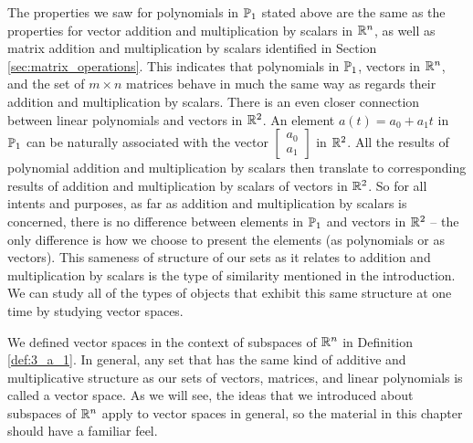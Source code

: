 The properties we saw for polynomials in $\mathbb{P}_1$ stated above are the same as the properties for vector addition and multiplication by scalars in $\mathbb{R}^n$, as well as matrix addition and multiplication by scalars identified in Section \ref{sec:matrix_operations}. This indicates that polynomials in $\mathbb{P}_1$, vectors in $\mathbb{R}^n$, and the set of $m \times n$ matrices behave in much the same way as regards their addition and multiplication by scalars. There is an even closer connection between linear polynomials and vectors in $\mathbb{R}^2$. An element $a(t) = a_0 + a_1t$ in $\mathbb{P}_1$ can be naturally associated with the vector $\left[ \begin{array}{c} a_0 \\ a_1 \end{array} \right]$ in $\mathbb{R}^2$. All the results of polynomial addition and multiplication by scalars then translate to corresponding results of addition and multiplication by scalars of vectors in $\mathbb{R}^2$. So for all intents and purposes, as far as addition and multiplication by scalars is concerned, there is no difference between elements in $\mathbb{P}_1$ and vectors in $\mathbb{R}^2$ -- the only difference is how we choose to present the elements (as polynomials or as vectors). This sameness of structure of our sets as it relates to addition and multiplication by scalars is the type of similarity mentioned in the introduction. We can study all of the types of objects that exhibit this same structure at one time by studying vector spaces.


We defined vector spaces in the context of subspaces of $\mathbb{R}^n$ in Definition \ref{def:3_a_1}. In general, any set that has the same kind of additive and multiplicative structure as our sets of vectors, matrices, and linear polynomials is called a vector space. As we will see, the ideas that we introduced about subspaces of $\mathbb{R}^n$ apply to vector spaces in general, so the material in this chapter should have a familiar feel. 



